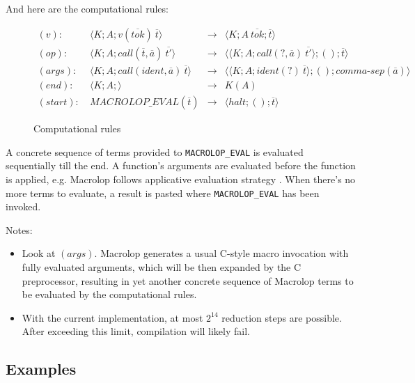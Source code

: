 \documentclass[12pt]{article}
\theoremstyle{break}
\begin{document}
And here are the computational rules:

\begin{figure}[H]
    \caption{Computational rules}

    \begin{align*}
        (v): \ & \langle K; A; v(\overline{tok}) \ \overline{t} \rangle & \to &
            \langle K; A \ \overline{tok}; \overline{t} \rangle \\
        (op): \ & \langle K; A; call(\overline{t}, \overline{a}) \ \overline{t'} \rangle & \to &
            \langle \langle K; A; call(?, \overline{a}) \ \overline{t'} \rangle; (); \overline{t} \rangle \\
        (args): \ & \langle K; A; call(ident, \overline{a}) \ \overline{t} \rangle & \to
            & \langle \langle K; A; ident(?) \ \overline{t} \rangle; (); comma\mbox{-}sep(\overline{a}) \rangle \\
        (end): \ & \langle K; A; \rangle & \to & K(A) \\
        (start): \ & MACROLOP\_EVAL(\overline{t}) & \to &
            \langle halt; (); \overline{t} \rangle
    \end{align*}
\end{figure}

A concrete sequence of terms provided to \texttt{MACROLOP\_EVAL} is evaluated sequentially till the end. A function's arguments
are evaluated before the function is applied, e.g. Macrolop follows applicative
evaluation strategy \cite{ApplicativeEvaluationStrategy}. When there's no more terms
to evaluate, a result is pasted where \texttt{MACROLOP\_EVAL} has been invoked.

Notes:

\begin{itemize}
    \item Look at $(args)$. Macrolop generates a usual C-style macro invocation with
    fully evaluated arguments, which will be then expanded by the C preprocessor, resulting
    in yet another concrete sequence of Macrolop terms to be evaluated by the computational
    rules.
    \item With the current implementation, at most $2^{14}$ reduction steps are
    possible. After exceeding this limit, compilation will likely fail.
\end{itemize}

\subsection{Examples}
\end{document}
